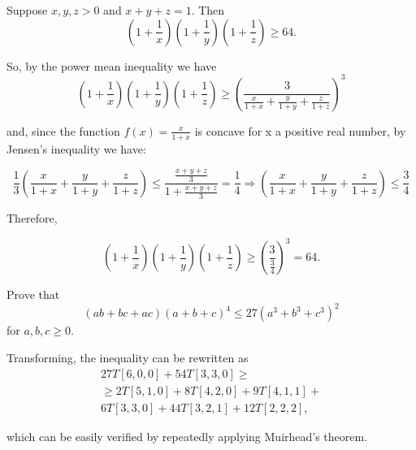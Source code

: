 \documentclass[12pt]{article}
\begin{document}
Suppose $x, y, z > 0$ and $x + y + z = 1$. Then
$$\left(1 + \frac{1}{x}\right)\left(1 + \frac{1}{y}\right)\left(1 + \frac{1}{z}\right) \geq 64.$$

So, by the power mean inequality we have
$$\left(1 + \frac{1}{x}\right)\left(1 + \frac{1}{y}\right)\left(1 + \frac{1}{z}\right) \geq \left(\frac{3}{\frac{x}{1 + x} + \frac{y}{1 + y} + \frac{z}{1 + z}}\right)^{3}$$

and, since the function $f(x) = \frac{x}{1 + x}$ is concave for x a positive real number, by Jensen's inequality we have:

$$\frac{1}{3}\left(\frac{x}{1 + x} + \frac{y}{1 + y} + \frac{z}{1 + z}\right) \leq \frac{\frac{x + y + z}{3}}{1 + \frac{x + y + z}{3}} = \frac{1}{4} \Rightarrow \left(\frac{x}{1 + x} + \frac{y}{1 + y} + \frac{z}{1 + z}\right) \leq \frac{3}{4}$$

Therefore, 

$$\left(1 + \frac{1}{x}\right)\left(1 + \frac{1}{y}\right)\left(1 + \frac{1}{z}\right) \geq \left(\frac{3}{\frac{3}{4}}\right)^{3} = 64.$$

Prove that $$(ab + bc + ac)(a + b + c)^4 \leq 27(a^3 + b^3 + c^3)^{2}$$ for $a, b, c \geq 0.$

Transforming, the inequality can be rewritten as
\begin{eqnarray}
27T[6, 0, 0] + 54T[3, 3, 0] \geq \nonumber\\
\geq 2T[5, 1, 0] + 8T[4, 2, 0] + 9T[4, 1, 1] + \nonumber\\
6T[3, 3, 0] + 44T[3, 2, 1] + 12T[2, 2, 2], \nonumber
\end{eqnarray}

which can be easily verified by repeatedly applying Muirhead's theorem.
\end{document}
